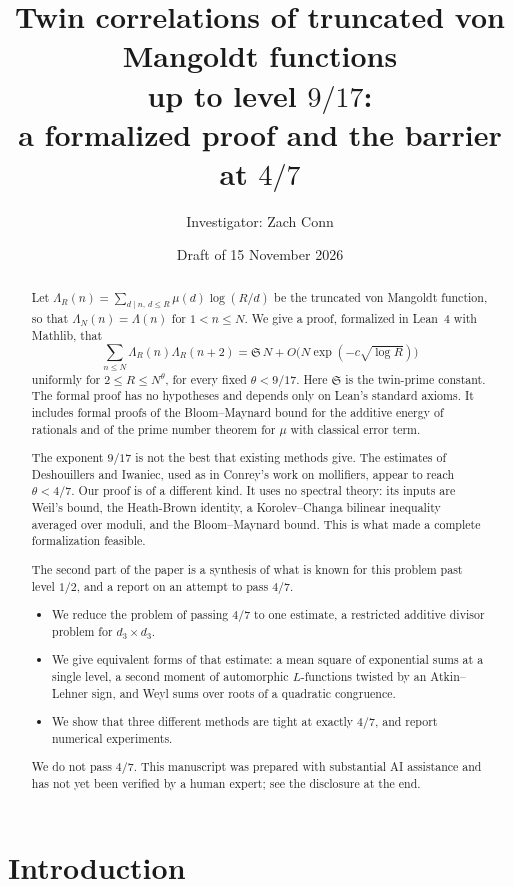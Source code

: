 \documentclass[11pt]{amsart}
\title[Twin correlations of $\Lambda_R$: a formalized proof and the $4/7$ barrier]
{Twin correlations of truncated von Mangoldt functions\\ up to level $9/17$:\\
a formalized proof and the barrier at $4/7$}
\author[Zach Conn]{Investigator: Zach Conn}
\date{Draft of 15 November 2026}
\theoremstyle{definition}
\theoremstyle{remark}
\numberwithin{equation}{section}
\begin{document}
\begin{abstract}
Let $\Lambda_R(n)=\sum_{d\mid n,\,d\le R}\mu(d)\log(R/d)$ be the truncated
von Mangoldt function, so that $\Lambda_N(n)=\Lambda(n)$ for $1<n\le N$.  We
give a proof, formalized in Lean~4 with Mathlib, that
\[
 \sum_{n\le N}\Lambda_R(n)\Lambda_R(n+2)
 =\mathfrak S\,N+O\bigl(N\exp(-c\sqrt{\log R})\bigr)
\]
uniformly for $2\le R\le N^{\theta}$, for every fixed $\theta<9/17$.  Here
$\mathfrak S$ is the twin-prime constant.  The formal proof has no hypotheses
and depends only on Lean's standard axioms.  It includes formal proofs of
the Bloom--Maynard bound for the additive energy of rationals and of the
prime number theorem for $\mu$ with classical error term.

The exponent $9/17$ is not the best that existing methods give.  The
estimates of Deshouillers and Iwaniec, used as in Conrey's work on
mollifiers, appear to reach $\theta<4/7$.  Our proof is of a different kind.
It uses no spectral theory: its inputs are Weil's bound, the Heath-Brown
identity, a Korolev--Changa bilinear inequality averaged over moduli, and the
Bloom--Maynard bound.  This is what made a complete formalization feasible.

The second part of the paper is a synthesis of what is known for this
problem past level $1/2$, and a report on an attempt to pass $4/7$.
\begin{itemize}
\item We reduce the problem of passing $4/7$ to one estimate, a restricted
additive divisor problem for $d_3\times d_3$.
\item We give equivalent forms of that estimate: a mean square of
exponential sums at a single level, a second moment of automorphic
$L$-functions twisted by an Atkin--Lehner sign, and Weyl sums over roots of
a quadratic congruence.
\item We show that three different methods are tight at exactly $4/7$, and
report numerical experiments.
\end{itemize}
We do not pass $4/7$.  This manuscript was prepared with substantial AI
assistance and has not yet been verified by a human expert; see the
disclosure at the end.
\end{abstract}

\maketitle

\section{Introduction}\label{sec:intro}
\end{document}
